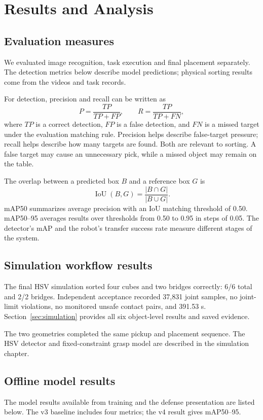 \section{Results and Analysis}
\subsection{Evaluation measures}
We evaluated image recognition, task execution and final placement separately. The detection metrics below describe model predictions; physical sorting results come from the videos and task records.

For detection, precision and recall can be written as
\begin{equation}
P=\frac{TP}{TP+FP},\qquad R=\frac{TP}{TP+FN},
\end{equation}
where $TP$ is a correct detection, $FP$ is a false detection, and $FN$ is a missed target under the evaluation matching rule. Precision helps describe false-target pressure; recall helps describe how many targets are found. Both are relevant to sorting. A false target may cause an unnecessary pick, while a missed object may remain on the table.

The overlap between a predicted box $B$ and a reference box $G$ is
\begin{equation}
\operatorname{IoU}(B,G)=\frac{|B\cap G|}{|B\cup G|}.
\end{equation}
mAP50 summarizes average precision with an IoU matching threshold of 0.50. mAP50--95 averages results over thresholds from 0.50 to 0.95 in steps of 0.05. The detector's mAP and the robot's transfer success rate measure different stages of the system.

\subsection{Simulation workflow results}
The final HSV simulation sorted four cubes and two bridges correctly: 6/6 total and 2/2 bridges. Independent acceptance recorded 37,831 joint samples, no joint-limit violations, no monitored unsafe contact pairs, and 391.53 s. Section~\ref{sec:simulation} provides all six object-level results and saved evidence.

The two geometries completed the same pickup and placement sequence. The HSV detector and fixed-constraint grasp model are described in the simulation chapter.

\subsection{Offline model results}
The model results available from training and the defense presentation are listed below. The v3 baseline includes four metrics; the v4 result gives mAP50--95.

